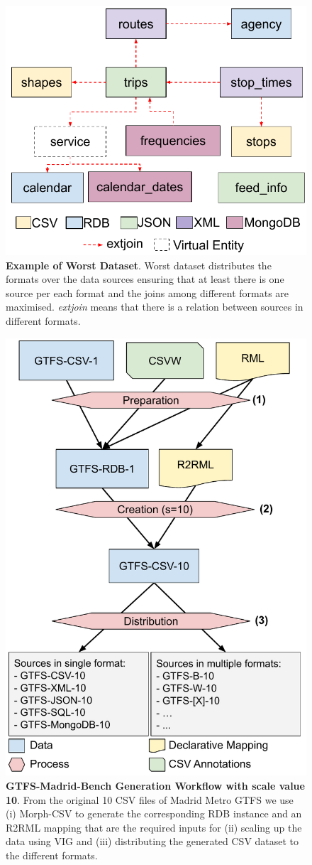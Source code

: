 \begin{figure}[h]
    \centering
    \includegraphics[width=0.85\linewidth]{figures/worst-dist.pdf}
    \caption{\textbf{Example of Worst Dataset}. Worst dataset distributes the formats over the data sources ensuring that at least there is one source per each format and the joins among different formats are maximised. \textit{extjoin} means that there is a relation between sources in different formats.}
    \label{fig:worst}
\end{figure}

\begin{figure}
    \centering
    \includegraphics[width=0.7\linewidth]{figures/gprocess.pdf}
    \caption{\textbf{GTFS-Madrid-Bench Generation Workflow with scale value 10}. From the original 10 CSV files of Madrid Metro GTFS we use (i) Morph-CSV to generate the corresponding RDB instance and an R2RML mapping that are the required inputs for (ii) scaling up the data using VIG and (iii) distributing the generated CSV dataset to the different formats.}
    \label{fig:generation}
\end{figure}

